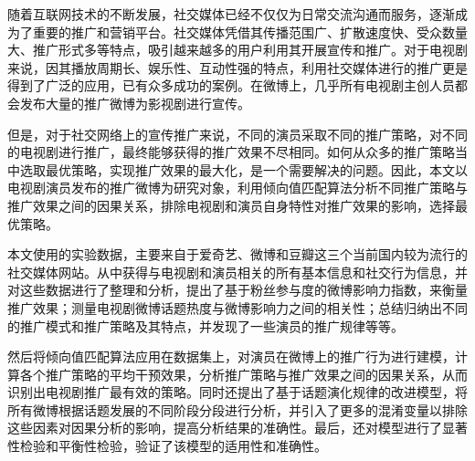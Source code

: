 \makeatletter
\ifthu@bachelor\relax\else
  \ifthu@doctor
  \else
    \ifthu@master
    \fi
  \fi
\fi
\makeatother



\begin{cabstract}

随着互联网技术的不断发展，社交媒体已经不仅仅为日常交流沟通而服务，逐渐成为了重要的推广和营销平台。社交媒体凭借其传播范围广、扩散速度快、受众数量大、推广形式多等特点，吸引越来越多的用户利用其开展宣传和推广。对于电视剧来说，因其播放周期长、娱乐性、互动性强的特点，利用社交媒体进行的推广更是得到了广泛的应用，已有众多成功的案例。在微博上，几乎所有电视剧主创人员都会发布大量的推广微博为影视剧进行宣传。

但是，对于社交网络上的宣传推广来说，不同的演员采取不同的推广策略，对不同的电视剧进行推广，最终能够获得的推广效果不尽相同。如何从众多的推广策略当中选取最优策略，实现推广效果的最大化，是一个需要解决的问题。因此，本文以电视剧演员发布的推广微博为研究对象，利用倾向值匹配算法分析不同推广策略与推广效果之间的因果关系，排除电视剧和演员自身特性对推广效果的影响，选择最优策略。

本文使用的实验数据，主要来自于爱奇艺、微博和豆瓣这三个当前国内较为流行的社交媒体网站。从中获得与电视剧和演员相关的所有基本信息和社交行为信息，并对这些数据进行了整理和分析，提出了基于粉丝参与度的微博影响力指数，来衡量推广效果；测量电视剧微博话题热度与微博影响力之间的相关性；总结归纳出不同的推广模式和推广策略及其特点，并发现了一些演员的推广规律等等。

然后将倾向值匹配算法应用在数据集上，对演员在微博上的推广行为进行建模，计算各个推广策略的平均干预效果，分析推广策略与推广效果之间的因果关系，从而识别出电视剧推广最有效的策略。同时还提出了基于话题演化规律的改进模型，将所有微博根据话题发展的不同阶段分段进行分析，并引入了更多的混淆变量以排除这些因素对因果分析的影响，提高分析结果的准确性。最后，还对模型进行了显著性检验和平衡性检验，验证了该模型的适用性和准确性。

\end{cabstract}


